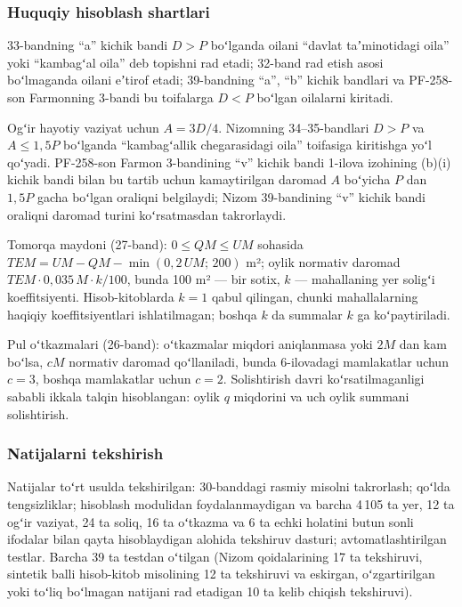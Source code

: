 \documentclass[14pt,a4paper]{extarticle}
\begin{document}
\subsubsection{Huquqiy hisoblash shartlari}
33-bandning “a” kichik bandi $D>P$ boʻlganda oilani “davlat taʼminotidagi oila” yoki “kambagʻal oila” deb topishni rad etadi; 32-band rad etish asosi boʻlmaganda oilani eʼtirof etadi; 39-bandning “a”, “b” kichik bandlari va PF-258-son Farmonning 3-bandi bu toifalarga $D<P$ boʻlgan oilalarni kiritadi\cite{res35,pf258}.

Ogʻir hayotiy vaziyat uchun $A=3D/4$. Nizomning 34–35-bandlari $D>P$ va $A\le1{,}5P$ boʻlganda “kambagʻallik chegarasidagi oila” toifasiga kiritishga yoʻl qoʻyadi. PF-258-son Farmon 3-bandining “v” kichik bandi 1-ilova izohining (b)(i) kichik bandi bilan bu tartib uchun kamaytirilgan daromad $A$ boʻyicha $P$ dan $1{,}5P$ gacha boʻlgan oraliqni belgilaydi; Nizom 39-bandining “v” kichik bandi oraliqni daromad turini koʻrsatmasdan takrorlaydi.

Tomorqa maydoni (27-band): $0\le QM\le UM$ sohasida $TEM=UM-QM-\min(0{,}2\,UM;\,200)$ m²; oylik normativ daromad $TEM\cdot0{,}035\,M\cdot k/100$, bunda 100 m² — bir sotix, $k$ — mahallaning yer soligʻi koeffitsiyenti. Hisob-kitoblarda $k=1$ qabul qilingan, chunki mahallalarning haqiqiy koeffitsiyentlari ishlatilmagan; boshqa $k$ da summalar $k$ ga koʻpaytiriladi.

Pul oʻtkazmalari (26-band): oʻtkazmalar miqdori aniqlanmasa yoki $2M$ dan kam boʻlsa, $cM$ normativ daromad qoʻllaniladi, bunda 6-ilovadagi mamlakatlar uchun $c=3$, boshqa mamlakatlar uchun $c=2$. Solishtirish davri koʻrsatilmaganligi sababli ikkala talqin hisoblangan: oylik $q$ miqdorini va uch oylik summani solishtirish.

\subsubsection{Natijalarni tekshirish}
Natijalar toʻrt usulda tekshirilgan: 30-banddagi rasmiy misolni takrorlash; qoʻlda tengsizliklar; hisoblash modulidan foydalanmaydigan va barcha 4\,105 ta yer, 12 ta ogʻir vaziyat, 24 ta soliq, 16 ta oʻtkazma va 6 ta echki holatini butun sonli ifodalar bilan qayta hisoblaydigan alohida tekshiruv dasturi; avtomatlashtirilgan testlar. Barcha 39 ta testdan oʻtilgan (Nizom qoidalarining 17 ta tekshiruvi, sintetik balli hisob-kitob misolining 12 ta tekshiruvi va eskirgan, oʻzgartirilgan yoki toʻliq boʻlmagan natijani rad etadigan 10 ta kelib chiqish tekshiruvi).
\end{document}

